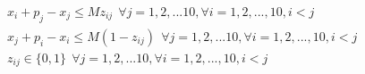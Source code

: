 \documentclass[12pt]{article}
\begin{document}
\begin{enumerate}
\begin{enumerate}
\begin{align*}
                                           & x_i+p_j - x_j \leq Mz_{ij} \ \ \forall j = 1,2,...10, \forall i = 1,2,...,10, i<j      \\
                                           & x_j + p_i - x_i \leq M(1-z_{ij})\ \ \forall j = 1,2,...10, \forall i = 1,2,...,10, i<j \\
                                           & z_{ij} \in \{0,1\} \ \ \forall j = 1,2,...10, \forall i = 1,2,...,10, i<j
                        \end{align*}
            \end{enumerate}
\end{enumerate}
\end{document}

